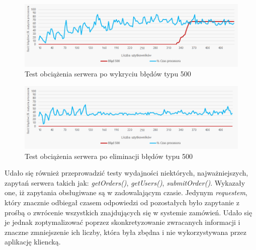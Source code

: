  \begin{figure}[ht]
	\centering
	\includegraphics[width=1\linewidth]{graphics/chapter-5/load-test-result-before-repair.png}
	\caption{Test obciążenia serwera po wykryciu błędów typu 500}
	\label{fig:load-test-result-before-repair}
\end{figure}
 \begin{figure}[ht]
	\centering
	\includegraphics[width=1\linewidth]{graphics/chapter-5/load-test-result-after-repair.png}
	\caption{Test obciążenia serwera po eliminacji błędów typu 500}
	\label{fig:load-test-result-after-repair}
\end{figure}


\noindent Udało się również przeprowadzić testy wydajności niektórych, najważniejszych, zapytań serwera takich jak: \textit{getOrders()}, \textit{getUsers()}, \textit{submitOrder()}. Wykazały one, iż zapytania obsługiwane są w zadowalającym czasie. Jedynym \textit{requestem}, który znacznie odbiegał czasem odpowiedzi od pozostałych było zapytanie z prośbą o zwrócenie wszystkich znajdujących się w systemie zamówień. Udało się je jednak zoptymalizować poprzez skonkretyzowanie zwracanych informacji i znaczne zmniejszenie ich liczby, która była zbędna i nie wykorzystywana przez aplikację kliencką.
\newpage

\vspace*{0.01\baselineskip}

